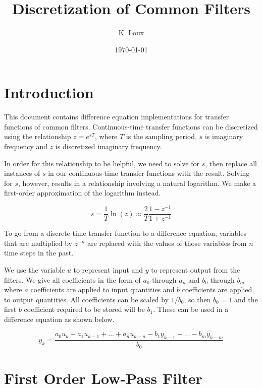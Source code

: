 \documentclass{article}
\begin{document}
\title{Discretization of Common Filters}
\author{K. Loux}
\date{\today}
\maketitle

\section{Introduction}
This document contains difference equation implementations for transfer functions of common filters. Continuous-time transfer functions can be discretized using the relationship $z = e^{sT}$, where $T$ is the sampling period, $s$ is imaginary frequency and $z$ is discretized imaginary frequency.

In order for this relationship to be helpful, we need to solve for $s$, then replace all instances of $s$ in our continuous-time transfer functions with the result.  Solving for $s$, however, results in a relationship involving a natural logarithm.  We make a first-order approximation of the logarithm instead.

\begin{equation}
s = \frac{1}{T} \ln \left( z \right) \approx \frac{2}{T} \frac{1 - z^{-1}}{1 + z^{-1}}
\end{equation}

To go from a discrete-time transfer function to a difference equation, variables that are multiplied by $z^{-n}$ are replaced with the values of those variables from $n$ time steps in the past.

We use the variable $u$ to represent input and $y$ to represent output from the filters.  We give all coefficients in the form of $a_0$ through $a_n$ and $b_0$ through $b_m$ where $a$ coefficients are applied to input quantities and $b$ coefficients are applied to output quantities.  All coefficients can be scaled by $1 / b_0$, so then $b_0 = 1$ and the first $b$ coefficient required to be stored will be $b_1$.  These can be used in a difference equation as shown below.

\begin{equation}
y_k = \frac{a_0 u_k + a_1 u_{k - 1} + ... + a_n u_{k - n} - b_1 y_{k - 1} - ... - b_m y_{k - m}}{b_0}
\end{equation}

\section{First Order Low-Pass Filter}
\end{document}
